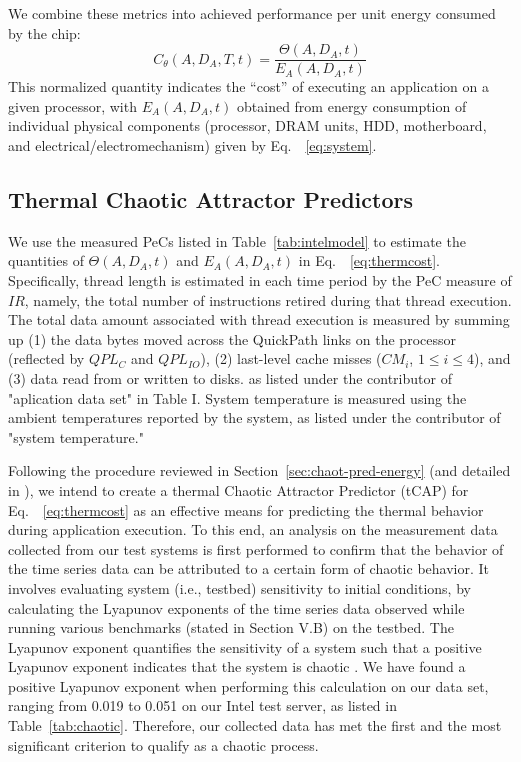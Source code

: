 \documentclass[times, 10pt,twocolumn]{IEEEtran}
\newcommand{\equationname}{Eq.\ }
\newcommand{\equationnames}{Eq.\ }
\begin{document}
We combine these metrics into achieved performance per unit energy
consumed by the chip:
\begin{equation}
\label{eq:thermcost} C_{\theta}(A, D_{A}, T, t)=\frac{\Theta (A, D_{A}, t)}{E_{A}(A, D_{A}, t)}
\end{equation}
This normalized quantity indicates the ``cost'' of executing an
application on a given processor, with $E_{A}(A, D_{A}, t)$ obtained
from energy consumption of individual physical components (processor, DRAM units, HDD, motherboard, and electrical/electromechanism) 
given by \equationname~\eqref{eq:system}.

\subsection{Thermal Chaotic Attractor Predictors}
\label{sec:therm-chaot-attr} 
We use the measured PeCs listed in Table~\ref{tab:intelmodel} to
estimate the quantities of $\Theta(A, D_{A}, t)$ and $E_{A}(A, D_{A}, t)$ in \equationname~\eqref{eq:thermcost}.   
Specifically, thread length is estimated in each
time period by the PeC measure of $IR$, namely, the total number of instructions
retired during that thread execution.    
The total data amount associated with thread execution is measured by
summing up (1) the data bytes moved across the QuickPath links on the processor
(reflected by $QPL_{C}$ and $QPL_{IO}$), (2) last-level cache misses ($CM_{i}$, $1\leq i \leq 4$), and (3) data read from or written to disks.
as listed under the contributor of "aplication data set" in Table I.
System temperature is measured using the ambient temperatures
reported by the system, as listed under the contributor of "system temperature."

Following the procedure reviewed in Section~\ref{sec:chaot-pred-energy} 
(and detailed in \cite{Lewis2010}),
we intend to create a thermal Chaotic Attractor Predictor (tCAP)
for \equationnames~\eqref{eq:thermcost}
as an effective means for predicting the thermal
behavior during application execution.
To this end, an analysis on the measurement data collected from our test systems
is first performed to confirm that the behavior of the time series data can be
attributed to a certain form of chaotic behavior.
It involves evaluating system (i.e., testbed) sensitivity to initial conditions,
by calculating the Lyapunov exponents of the time series data observed
while running various benchmarks (stated in Section V.B) on the testbed.
The Lyapunov exponent quantifies the sensitivity of a system
such that a positive Lyapunov
exponent indicates that the system is chaotic \cite{Sprott2003}.  
We have found a positive Lyapunov exponent when performing this calculation on 
our data set, ranging from 0.019 to 0.051 on our Intel test server, as listed in
Table~\ref{tab:chaotic}.  Therefore, our collected data has met the first and the
most significant criterion to qualify as a chaotic process.
\end{document}
